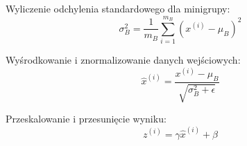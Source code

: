 \documentclass[a4paper,11pt]{article}
\begin{document}
    \smallskip

    \noindent
    \begin{minipage}[H]{\textwidth}
        \setlength\parindent{17pt} Wyliczenie odchylenia standardowego dla minigrupy: \\
        \begin{equation}
            \label{eq:minibatch_std_dev}
            \sigma_{B}^{2} = \frac{1}{m_{B}} \displaystyle\sum_{i=1}^{m_{B}} (x^{(i)} - \mu_{B})^{2}
        \end{equation}
    \end{minipage}

    \smallskip

    \noindent
    \begin{minipage}[H]{\textwidth}
        \setlength\parindent{17pt} Wyśrodkowanie i znormalizowanie danych wejściowych: \\
        \begin{equation}
            \label{eq:centering_and_normalizing_input}
            \widehat{x}^{(i)} = \frac{x^{(i)} - \mu_{B}}{\sqrt{\sigma_{B}^{2} + \epsilon}}
        \end{equation}
    \end{minipage}

    \smallskip

    \noindent
    \begin{minipage}[H]{\textwidth}
        \setlength\parindent{17pt} Przeskalowanie i przesunięcie wyniku: \\
        \begin{equation}
            \label{eq:rescaling_and_translating_result}
            z^{(i)} = \gamma\widehat{x}^{(i)} + \beta
        \end{equation}
    \end{minipage}

    \smallskip
\end{document}
